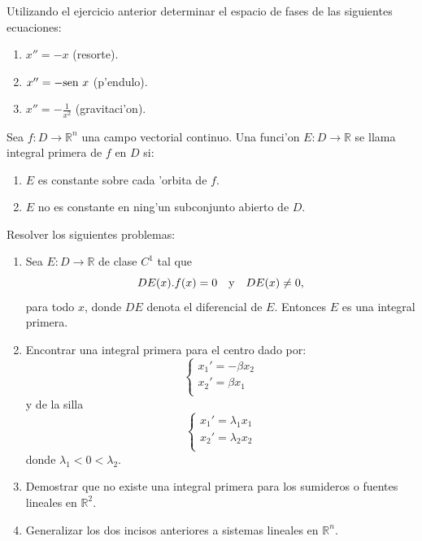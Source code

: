 \begin{ejercicio} Utilizando el ejercicio anterior determinar el
espacio de fases de las siguientes ecuaciones:
\begin{enumerate}
\item $x''=-x$ (resorte).
\item $x''=-\hbox{sen } x$ (p'endulo).
\item $x''=-\frac{1}{x^2}$ (gravitaci'on).
\end{enumerate}
\end{ejercicio}





\begin{ejercicio} Sea $f:D\to\mathbb{R}^n$ una campo vectorial
continuo. Una funci'on $E:D\to\mathbb{R}$ se llama integral
primera de $f$ en $D$ si:
\begin{enumerate}
\item $E$ es constante sobre cada 'orbita de $f$.
\item $E$ no es constante en ning'un subconjunto abierto de $D$.

\end{enumerate}
Resolver los siguientes problemas:
\begin{enumerate}
\item Sea $E:D\to\mathbb{R}$  de clase
$C^1$  tal que
\[
    DE(x).f(x)=0\quad\hbox{y}\quad DE(x)\neq 0,
\]
para todo $x$, donde $DE$ denota el diferencial de $E$. Entonces
$E$ es una integral primera.
\item Encontrar una integral primera para el centro dado por:
\[
    \left\{%
\begin{array}{ll}
   x_1'=-\beta x_2 \\
    x_2'=\beta x_1 \\
\end{array}%
\right.
\]
y de la silla
\[
    \left\{%
\begin{array}{ll}
   x_1'=\lambda_1 x_1 \\
    x_2'=\lambda_2 x_2 \\
\end{array}%
\right.
\]
donde $\lambda_1<0<\lambda_2$.

\item Demostrar que no existe una integral primera para los
sumideros o fuentes lineales en $\mathbb{R}^2$.

\item Generalizar los dos incisos anteriores a
sistemas lineales en $\mathbb{R}^n$.


\end{enumerate}
\end{ejercicio}
